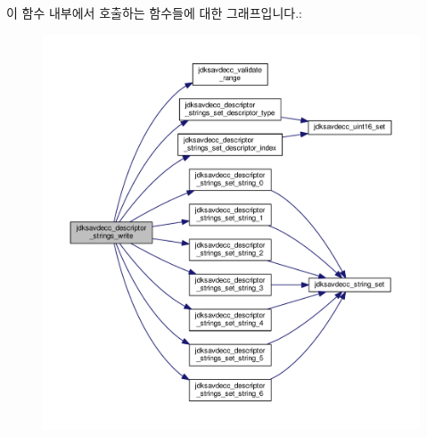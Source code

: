 이 함수 내부에서 호출하는 함수들에 대한 그래프입니다.\+:
\nopagebreak
\begin{figure}[H]
\begin{center}
\leavevmode
\includegraphics[width=350pt]{group__descriptor__strings_ga4d6eb9bd6f139a4de2f5383cf911d253_cgraph}
\end{center}
\end{figure}


